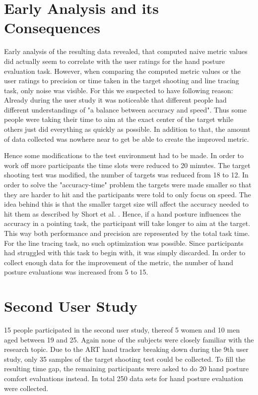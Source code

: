 \section{Early Analysis and its Consequences}

Early analysis of the resulting data revealed, that computed naive metric values did actually seem to correlate with the user ratings for the hand posture evaluation task. However, when comparing the computed metric values or the user ratings to precision or time taken in the target shooting and line tracing task, only noise was visible. 
For this we suspected to have following reason: Already during the user study it was noticeable that different people had different understandings of "a balance between accuracy and speed". Thus some people were taking their time to aim at the exact center of the target while others just did everything as quickly as possible.
In addition to that, the amount of data collected was nowhere near to get be able to create the improved metric.

Hence some modifications to the test environment had to be made. In order to work off more participants the time slots were reduced to 20 minutes. The target shooting test was modified, the number of targets was reduced from 18 to 12. In order to solve the "accuracy-time" problem the targets were made smaller so that they are harder to hit and the participants were told to only focus on speed. The idea behind this is that the smaller target size will affect the accuracy needed to hit them as described by Short et al. \cite{short1999precision}. Hence, if a hand posture influences the accuracy in a pointing task, the participant will take longer to aim at the target. This way both performance and precision are represented by the total task time. 
For the line tracing task, no such optimization was possible. Since participants had struggled with this task to begin with, it was simply discarded.
In order to collect enough data for the improvement of the metric, the number of hand posture evaluations was increased from 5 to 15.

\section{Second User Study}

15 people participated in the second user study, thereof 5 women and 10 men aged between 19 and 25. Again none of the subjects were closely familiar with the research topic.
Due to the ART hand tracker breaking down during the 9th user study, only 35 samples of the target shooting test could be collected. To fill the resulting time gap, the remaining participants were asked to do 20 hand posture comfort evaluations instead.
In total 250 data sets for hand posture evaluation were collected.